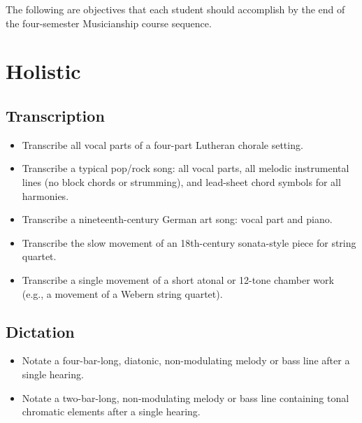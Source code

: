 
\def\mytitle{Learning and mastery objectives for Musicianship sequence}
\def\myauthor{Kris P. Shaffer}
\def\latexmode{memoir}

The following are objectives that each student should accomplish by the end of the four-semester Musicianship course sequence.

\chapter{Holistic}
\label{holistic}

\section{Transcription}
\label{transcription}

\begin{itemize}
\item Transcribe all vocal parts of a four-part Lutheran chorale setting.

\item Transcribe a typical pop\slash rock song: all vocal parts, all melodic instrumental lines (no block chords or strumming), and lead-sheet chord symbols for all harmonies.

\item Transcribe a nineteenth-century German art song: vocal part and piano.

\item Transcribe the slow movement of an 18th-century sonata-style piece for string quartet.

\item Transcribe a single movement of a short atonal or 12-tone chamber work (e.g., a movement of a Webern string quartet).

\end{itemize}

\section{Dictation}
\label{dictation}

\begin{itemize}
\item Notate a four-bar-long, diatonic, non-modulating melody or bass line after a single hearing.

\item Notate a two-bar-long, non-modulating melody or bass line containing tonal chromatic elements after a single hearing.

\end{itemize}

